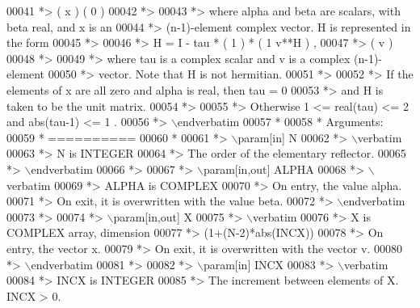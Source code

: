\begin{DoxyCode}
00041 \textcolor{comment}{*>              (   x   )   (   0  )}
00042 \textcolor{comment}{*>}
00043 \textcolor{comment}{*> where alpha and beta are scalars, with beta real, and x is an}
00044 \textcolor{comment}{*> (n-1)-element complex vector. H is represented in the form}
00045 \textcolor{comment}{*>}
00046 \textcolor{comment}{*>       H = I - tau * ( 1 ) * ( 1 v**H ) ,}
00047 \textcolor{comment}{*>                     ( v )}
00048 \textcolor{comment}{*>}
00049 \textcolor{comment}{*> where tau is a complex scalar and v is a complex (n-1)-element}
00050 \textcolor{comment}{*> vector. Note that H is not hermitian.}
00051 \textcolor{comment}{*>}
00052 \textcolor{comment}{*> If the elements of x are all zero and alpha is real, then tau = 0}
00053 \textcolor{comment}{*> and H is taken to be the unit matrix.}
00054 \textcolor{comment}{*>}
00055 \textcolor{comment}{*> Otherwise  1 <= real(tau) <= 2  and  abs(tau-1) <= 1 .}
00056 \textcolor{comment}{*> \(\backslash\)endverbatim}
00057 \textcolor{comment}{*}
00058 \textcolor{comment}{*  Arguments:}
00059 \textcolor{comment}{*  ==========}
00060 \textcolor{comment}{*}
00061 \textcolor{comment}{*> \(\backslash\)param[in] N}
00062 \textcolor{comment}{*> \(\backslash\)verbatim}
00063 \textcolor{comment}{*>          N is INTEGER}
00064 \textcolor{comment}{*>          The order of the elementary reflector.}
00065 \textcolor{comment}{*> \(\backslash\)endverbatim}
00066 \textcolor{comment}{*>}
00067 \textcolor{comment}{*> \(\backslash\)param[in,out] ALPHA}
00068 \textcolor{comment}{*> \(\backslash\)verbatim}
00069 \textcolor{comment}{*>          ALPHA is COMPLEX}
00070 \textcolor{comment}{*>          On entry, the value alpha.}
00071 \textcolor{comment}{*>          On exit, it is overwritten with the value beta.}
00072 \textcolor{comment}{*> \(\backslash\)endverbatim}
00073 \textcolor{comment}{*>}
00074 \textcolor{comment}{*> \(\backslash\)param[in,out] X}
00075 \textcolor{comment}{*> \(\backslash\)verbatim}
00076 \textcolor{comment}{*>          X is COMPLEX array, dimension}
00077 \textcolor{comment}{*>                         (1+(N-2)*abs(INCX))}
00078 \textcolor{comment}{*>          On entry, the vector x.}
00079 \textcolor{comment}{*>          On exit, it is overwritten with the vector v.}
00080 \textcolor{comment}{*> \(\backslash\)endverbatim}
00081 \textcolor{comment}{*>}
00082 \textcolor{comment}{*> \(\backslash\)param[in] INCX}
00083 \textcolor{comment}{*> \(\backslash\)verbatim}
00084 \textcolor{comment}{*>          INCX is INTEGER}
00085 \textcolor{comment}{*>          The increment between elements of X. INCX > 0.}

\end{DoxyCode}
